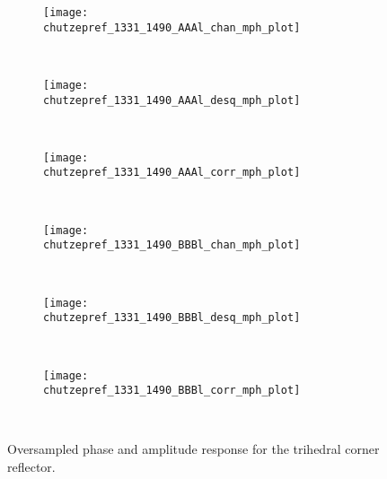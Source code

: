 \begin{figure*}[ht]
	\begin{subfigure}[b]{0.6\columnwidth}
		\centering
		\texttt{[image: \\chutzepref\_1331\_1490\_AAAl\_chan\_mph\_plot]}
		\label{fig:tcr_mph:HH_uncorr}
	\end{subfigure}~
	\begin{subfigure}[b]{0.6\columnwidth}
		\centering
		\texttt{[image: \\chutzepref\_1331\_1490\_AAAl\_desq\_mph\_plot]}
		\label{fig:tcr_mph:HH_corr}
	\end{subfigure}~
	\begin{subfigure}[b]{0.6\columnwidth}
		\centering
		\texttt{[image: \\chutzepref\_1331\_1490\_AAAl\_corr\_mph\_plot]}
		\label{fig:tcr_mph:HH_corr_ph}
	\end{subfigure}\\
	\begin{subfigure}[b]{0.6\columnwidth}
		\centering
		\texttt{[image: \\chutzepref\_1331\_1490\_BBBl\_chan\_mph\_plot]}
		\label{fig:tcr_mph:VV_uncorr}
	\end{subfigure}~
	\begin{subfigure}[b]{0.6\columnwidth}
		\centering
		\texttt{[image: \\chutzepref\_1331\_1490\_BBBl\_desq\_mph\_plot]}
		\label{fig:tcr_mph:VV_corr}
	\end{subfigure}~
	\begin{subfigure}[b]{0.6\columnwidth}
		\centering
		\texttt{[image: \\chutzepref\_1331\_1490\_BBBl\_corr\_mph\_plot]}
		\label{fig:tcr_mph:VV_corr_ph}
	\end{subfigure}~

	\caption{Oversampled phase and amplitude response for the trihedral corner reflector.}
	\label{fig:tcr_mph}
\end{figure*}
